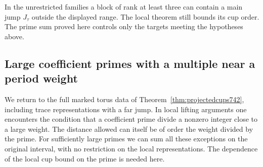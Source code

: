 \documentclass[a4paper,11pt]{article}
\theoremstyle{definition}
\theoremstyle{remark}
\numberwithin{equation}{section}
\begin{document}
In the unrestricted families a block of rank at least
three can contain a main jump \(J_\tau\) outside the
displayed range. The local theorem still bounds its cup
order. The prime sum proved here controls only the targets
meeting the hypotheses above.
\clearpage

\subsection{Large coefficient primes with a multiple near a period weight}
\label{sec:largeweightprimes766}
We return to the full marked torus data of
Theorem~\ref{thm:projectedcups742}, including trace
representations with a far jump. In local lifting arguments
one encounters the condition that a coefficient prime
divide a nonzero integer close to a large weight. The
distance allowed can itself be of order the weight divided
by the prime. For sufficiently large primes we can sum
all these exceptions on the original interval, with no
restriction on the local representations. The dependence
of the local cup bound on the prime is needed here.
\end{document}

